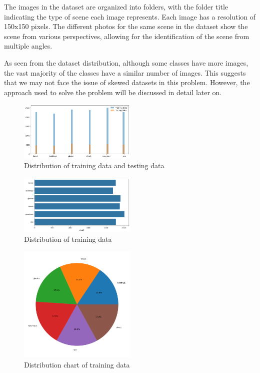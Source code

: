 \documentclass[conference]{IEEEtran}
\begin{document}
\vspace{-10pt}

The images in the dataset are organized into folders, with the folder title indicating the type of scene each image represents. Each image has a resolution of 150x150 pixels. The different photos for the same scene in the dataset show the scene from various perspectives, allowing for the identification of the scene from multiple angles.

As seen from the dataset distribution, although some classes have more images, the vast majority of the classes have a similar number of images. This suggests that we may not face the issue of skewed datasets in this problem. However, the approach used to solve the problem will be discussed in detail later on.

\begin{figure}[H]
\centering
    \includegraphics[width=0.5\textwidth]{images/distTrainTest.png}
    \caption{Distribution of training data and testing data}
\end{figure}

\vspace{-10pt}

\begin{figure}[H]
\centering
    \includegraphics[width=0.5\textwidth]{images/distTrain.png}
    \caption{Distribution of training data}
\end{figure}

\vspace{-10pt}

\begin{figure}[H]
\centering
    \includegraphics[width=0.5\textwidth]{images/chartTrain.png}
    \caption{Distribution chart of training data}
\end{figure}
\end{document}
